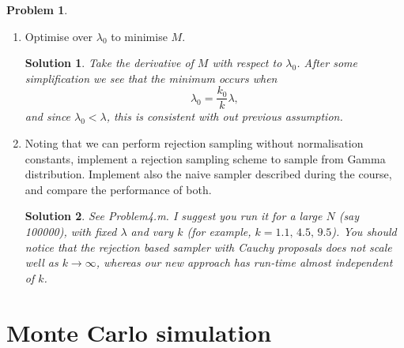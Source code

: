 \documentclass[11pt,a4paper]{article}
\theoremstyle{definition}
\newtheorem{problem}{Problem}
\theoremstyle{plain}
\newtheorem*{solution}{Solution}
\begin{document}
\begin{problem}
\begin{enumerate}
\item Optimise over $\lambda_0$ to minimise $M$.

\begin{solution}
Take the derivative of $M$ with respect to $\lambda_0$.  After some simplification we see that the minimum occurs when
$$
  \lambda_0 = \frac{k_0}{k}\lambda,
$$
and since $\lambda_0 < \lambda$, this is consistent with out previous assumption.
\end{solution}
\item {Noting that we can perform rejection sampling without normalisation constants}, implement a rejection sampling scheme to sample from Gamma distribution.   Implement also the naive sampler described during the course, and compare the performance of both.\\
\begin{solution}
See Problem4.m.  I suggest you run it for a large $N$ (say 100000), with fixed $\lambda$ and vary $k$ (for example, $k = 1.1, \, 4.5, \, 9.5$). You should notice that the rejection based sampler with Cauchy proposals does not scale well as $k\rightarrow \infty$, whereas our new approach has run-time almost independent of $k$.
\end{solution}
\end{enumerate}
\end{problem}

\section*{Monte Carlo simulation}%
\label{sec:monte_carlo_simulation}
\end{document}
